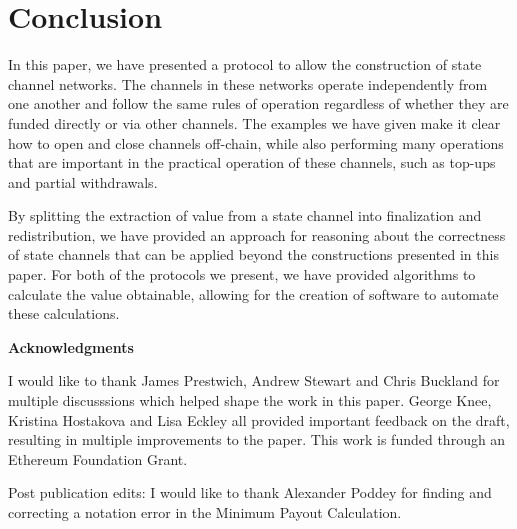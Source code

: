 \section{Conclusion}

In this paper, we have presented a protocol to allow the construction of state channel networks.
The channels in these networks operate independently from one another and follow the same rules of operation regardless of whether they are funded directly or via other channels.
The examples we have given make it clear how to open and close channels off-chain, while also performing many operations that are important in the practical operation of these channels, such as top-ups and partial withdrawals.

By splitting the extraction of value from a state channel into finalization and redistribution, we have provided an approach for reasoning about the correctness of state channels that can be applied beyond the constructions presented in this paper.
For both of the protocols we present, we have provided algorithms to calculate the value obtainable, allowing for the creation of software to automate these calculations.



\textbf{Acknowledgments}

I would like to thank James Prestwich, Andrew Stewart and Chris Buckland for multiple discusssions which helped shape the work in this paper. 
George Knee, Kristina Hostakova and Lisa Eckley all provided important feedback on the draft, resulting in multiple improvements to the paper.
This work is funded through an Ethereum Foundation Grant.

Post publication edits: I would like to thank Alexander Poddey for finding and correcting a notation error in the Minimum Payout Calculation.

